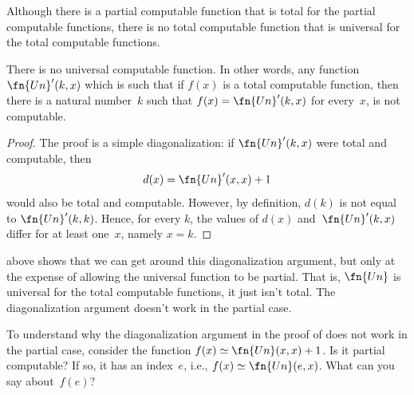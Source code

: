 \documentclass[../../../include/open-logic-section]{subfiles}
\begin{document}

Although there is a partial computable function that is total for the
partial computable functions, there is no total computable
function that is universal for the total computable functions. 

\begin{thm}
There is no universal computable function. In other words, any
function $\fn{Un}'(k, x)$ which is such that if $f(x)$ is a total
computable function, then there is a natural number~$k$ such that
$f(x) = \fn{Un}'(k,x)$ for every~$x$, is not computable.
\end{thm}

\begin{proof}
The proof is a simple diagonalization: if $\fn{Un}'(k,x)$ were total
and computable, then
\[
d(x) = \fn{Un}'(x, x) + 1
\]
would also be total and computable. However, by definition, $d(k)$ is
not equal to $\fn{Un}'(k,k)$. Hence, for every $k$, the values of
$d(x)$ and~$\fn{Un}'(k, x)$ differ for at least one~$x$, namely $x = k$.
\end{proof}

\begin{explain}
 above shows that we can get around this
diagonalization argument, but only at the expense of allowing the
universal function to be partial. That is, $\fn{Un}$ is universal for
the total computable functions, it just isn't total. The
diagonalization argument doesn't work in the partial case. 
\end{explain}

\begin{prob}
  To understand why the diagonalization argument in the proof of
   does not work in the partial
  case, consider the function $f(x) \simeq \fn{Un}(x,x)+1$. Is it
  partial computable? If so, it has an index~$e$, i.e., $f(x) \simeq
  \fn{Un}(e,x)$. What can you say about~$f(e)$?
\end{prob}
\end{document}
